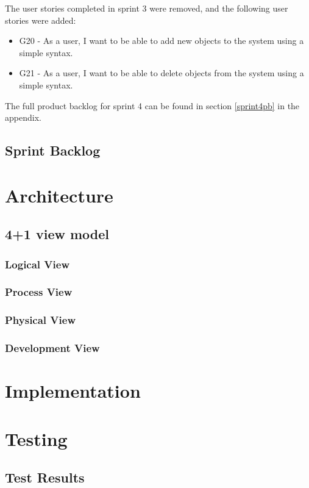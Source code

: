 The user stories completed in sprint 3 were removed, and the following user stories were added:

\begin{itemize}
\item G20 - As a user, I want to be able to add new objects to the system using a simple syntax.
\item G21 - As a user, I want to be able to delete objects from the system using a simple syntax.
\end{itemize}

The full product backlog for sprint 4 can be found in section \ref{sprint4pb} in the appendix.

\subsection{Sprint Backlog}

\section{Architecture}
\subsection{4+1 view model}
\subsubsection{Logical View}
\subsubsection{Process View}
\subsubsection{Physical View}
\subsubsection{Development View}

\section{Implementation}

\section{Testing}
\subsection{Test Results}
